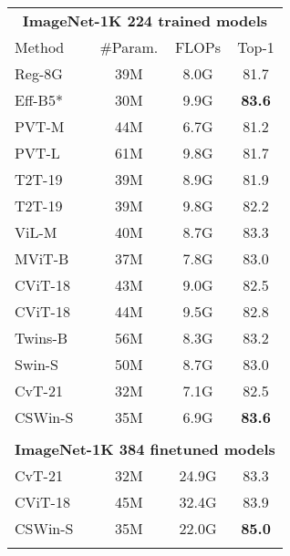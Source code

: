 \documentclass[10pt,twocolumn,letterpaper]{article}
\begin{document}
\begin{table*}[t]
\begin{subtable}[t]{0.33\linewidth}
{{\begin{tabular}[t]{l|cc|c}
\toprule
\multicolumn{4}{c}{\textbf{ImageNet-1K 224 trained models}} \\
Method &   \#Param. & FLOPs & Top-1 \\
\midrule
Reg-8G~\cite{radosavovic2020reg}           & 39M & 8.0G  & 81.7 \\
Eff-B5*~\cite{tan2019efficientnet}         & 30M & 9.9G  & \textbf{83.6} \\
\hline
PVT-M~\cite{wang2021pyramid}               & 44M & 6.7G  & 81.2 \\
PVT-L~\cite{wang2021pyramid}               & 61M & 9.8G  & 81.7 \\
T2T-19~\cite{yuan2021tokens}               & 39M & 8.9G  & 81.9 \\
T2T-19~\cite{yuan2021tokens}           & 39M & 9.8G  & 82.2 \\
ViL-M~\cite{zhang2021mvit}               & 40M & 8.7G  & 83.3 \\
MViT-B ~\cite{fan2021multiscale}           & 37M & 7.8G  & 83.0 \\
CViT-18~\cite{chen2021crossvit}            & 43M & 9.0G  & 82.5 \\
CViT-18~\cite{chen2021crossvit}      & 44M & 9.5G  & 82.8 \\
Twins-B~\cite{chu2021twins}                & 56M & 8.3G  & 83.2 \\
Swin-S~\cite{liu2021swin}                  & 50M & 8.7G  & 83.0 \\
CvT-21~\cite{wu2021cvt}                    & 32M & 7.1G  & 82.5 \\
\rowcolor{Graylight} 
CSWin-S                                    & 35M & 6.9G  & \textbf{83.6} \\
& & \\
\midrule
\multicolumn{4}{c}{\textbf{ImageNet-1K 384 finetuned models}} \\
CvT-21 ~\cite{wu2021cvt}                   & 32M & 24.9G & 83.3 \\
CViT-18~\cite{chen2021crossvit}      & 45M & 32.4G & 83.9 \\
\rowcolor{Graylight} 
CSWin-S                                    & 35M & 22.0G & \textbf{85.0} \\
& & \\


\end{tabular}}}
\end{subtable}
\end{table*}
\end{document}
